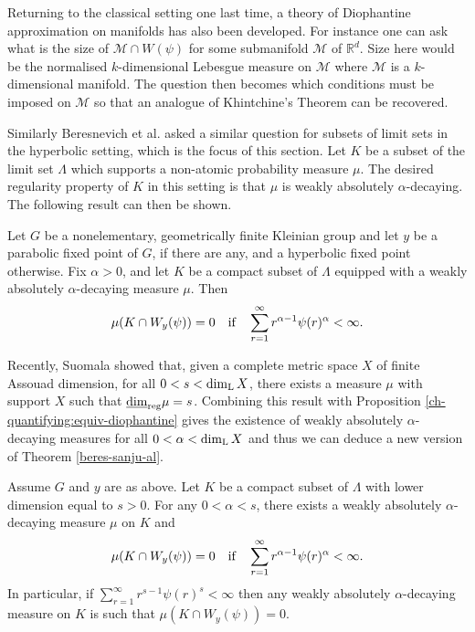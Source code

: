 Returning to the classical setting one last time, a theory of Diophantine approximation on manifolds has also been developed. For instance one can ask what is the size of $\mathcal{M} \cap W(\psi)$ for some submanifold $\mathcal{M}$ of $\mathbb{R}^d$. Size here would be the normalised $k$-dimensional Lebesgue measure on $\mathcal{M}$ where $\mathcal{M}$ is a $k$-dimensional manifold. The question then becomes which conditions must be imposed on $\mathcal{M}$ so that an analogue of Khintchine's Theorem can be recovered.

Similarly Beresnevich et al. \cite{beres-sanju-al} asked a similar question for subsets of limit sets in the hyperbolic setting, which is the focus of this section. Let $K$ be a subset of the limit set $\Lambda$ which supports a non-atomic probability measure $\mu$. The desired regularity property of $K$ in this setting is that $\mu$ is weakly absolutely $\alpha$-decaying. The following result can then be shown.

\begin{theorem}\label{beres-sanju-al}
	Let $G$ be a nonelementary, geometrically finite Kleinian group and let $y$ be a parabolic fixed point of $G$, if there are any, and a hyperbolic fixed point otherwise. Fix $\alpha > 0$, and let $K$ be a compact subset of $\Lambda$ equipped with a weakly absolutely $\alpha$-decaying measure $\mu$. Then
	\[
	\mu(K\cap W_y(\psi)) = 0 \quad \textup{if} \quad \sum_{r=1}^\infty r^{\alpha-1} \psi(r)^{\alpha} < \infty.
	\]
\end{theorem}

Recently, Suomala \cite{suomala} showed that, given a complete metric space $X$ of finite Assouad dimension, for all $0 < s < \dim_{\textup{L}} X$, there exists a measure $\mu$ with support $X$ such that $\underline{\dim}_{\textup{reg}} \mu = s$. Combining this result with Proposition \ref{ch-quantifying:equiv-diophantine} gives the existence of weakly absolutely $\alpha$-decaying measures for all $0 < \alpha < \dim_{\textup{L}} X$ and thus we can deduce a new version of Theorem \ref{beres-sanju-al}. 

\begin{theorem}
	Assume $G$ and $y$ are as above. Let $K$ be a compact subset of $\Lambda$ with lower dimension equal to $s > 0$. For any $0 < \alpha < s$, there exists a weakly absolutely $\alpha$-decaying measure $\mu$ on $K$ and 
	\[
	\mu(K\cap W_y(\psi)) = 0 \quad \textup{if} \quad \sum_{r=1}^\infty r^{\alpha-1} \psi(r)^{\alpha} < \infty.
	\]
	In particular, if  $\sum_{r=1}^\infty r^{s-1} \psi(r)^{s} < \infty$ then any weakly absolutely $\alpha$-decaying measure on $K$ is such that $\mu(K\cap W_y(\psi)) = 0$.
\end{theorem}


